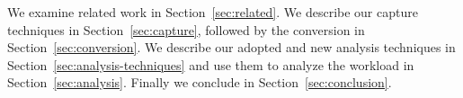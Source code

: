 We examine related work in Section~\ref{sec:related}.  We describe our
capture techniques in Section~\ref{sec:capture}, followed by the
conversion in Section~\ref{sec:conversion}. We describe our adopted and
new analysis techniques in Section~\ref{sec:analysis-techniques} and
use them to analyze the workload in Section~\ref{sec:analysis}.
Finally we conclude in Section~\ref{sec:conclusion}.

